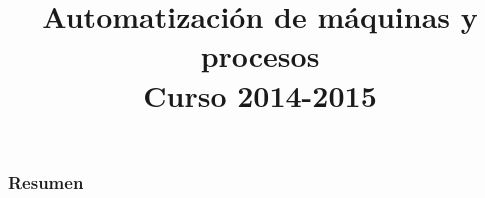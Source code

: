 \documentclass[11pt, 
				t, 
				beamer,
				breaklinks = true,
				bookmarksnumbered,
				spanish,
				]{beamer}
\title [Presentacion de la asignatura. Normativa
	(\insertframenumber/\inserttotalframenumber)
	]
	{\Large\bf Automatización de máquinas y procesos\\ Curso 2014-2015}
\author[José V. Salcedo]{}
\date{}
\institute[Departamento de Ingeniería de Sistemas y Automática]{}
\begin{document}

\nocite{moreno1999automatizacion}
\nocite{moreno1999grafcet}
\nocite{piedrafita2004ingenieria}
\nocite{ramirez1994automatizacion}


%


\begin{frame}[fragile, label = indice]
\frametitle{Resumen}
\tableofcontents[pausesections]
\end{frame}














\end{document}
